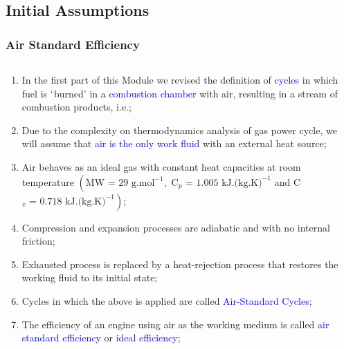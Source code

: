 \documentclass[10pt,compress]{beamer}
\begin{document}
\subsection{Initial Assumptions}
\begin{frame}
 \frametitle{Air Standard Efficiency}
   \begin{columns}
     \begin{column}[c]{0.5\linewidth}
       \begin{enumerate} \scriptsize
         \item<1-> In the first part of this Module we revised the definition of \textcolor{blue}{cycles} in which fuel is $\lq$burned' in a \textcolor{blue}{combustion chamber} with air, resulting in a stream of combustion products, i.e.;
         \item<2-> Due to the complexity on thermodynamics analysis of gas power cycle, we will assume that \textcolor{blue}{air is the only work fluid} with an external heat source;
         \item<3-> Air behaves as an ideal gas with constant heat capacities at room temperature $\left(\text{MW = 29 g.mol}^{-1},\text{ C}_{p}\text{ = 1.005 kJ.(kg.K)}^{-1}\right.$ and C$\left._{v}\text{ = 0.718 kJ.(kg.K)}^{-1}\right)$;
         \item<4-> Compression and expansion processes are adiabatic and with no internal friction;
         \item<5-> Exhausted process is replaced by a heat-rejection process that restores the working fluid to its initial state;
         \item<6-> Cycles in which the above is applied are called \textcolor{blue}{Air-Standard Cycles};
         \item<7-> The efficiency of an engine using air as the working medium is called \textcolor{blue}{air standard efficiency} or \textcolor{blue}{ideal efficiency};
       \end{enumerate}
     \end{column}  
     \begin{column}[c]{0.5\linewidth}
\end{column}
\end{columns}
\end{frame}
\end{document}
